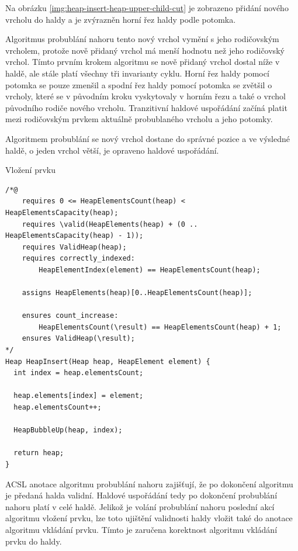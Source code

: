 Na obrázku \ref{img:heap-insert-heap-upper-child-cut} je zobrazeno přidání nového vrcholu do haldy a je zvýrazněn horní řez haldy podle potomka.

Algoritmus probublání nahoru tento nový vrchol vymění s jeho rodičovským vrcholem, protože nově přidaný vrchol má menší hodnotu než jeho rodičovský vrchol. Tímto prvním krokem algoritmu se nově přidaný vrchol dostal níže v haldě, ale stále platí všechny tři invarianty cyklu. Horní řez haldy pomocí potomka se pouze zmenšil a spodní řez haldy pomocí potomka se zvětšil o vrcholy, které se v původním kroku vyskytovaly v horním řezu a také o vrchol původního rodiče nového vrcholu. Tranzitivní haldové uspořádání začíná platit mezi rodičovským prvkem aktuálně probublaného vrcholu a jeho potomky.

Algoritmem probublání se nový vrchol dostane do správné pozice a ve výsledné haldě, o jeden vrchol větší, je opraveno haldové uspořádání.

\begin{listing}[H]
	\caption{Vložení prvku}
	\label{list:HeapInsert}
	\begin{verbatim}
/*@
    requires 0 <= HeapElementsCount(heap) < HeapElementsCapacity(heap);
    requires \valid(HeapElements(heap) + (0 .. HeapElementsCapacity(heap) - 1));
    requires ValidHeap(heap);
    requires correctly_indexed:
    	HeapElementIndex(element) == HeapElementsCount(heap);

    assigns HeapElements(heap)[0..HeapElementsCount(heap)];
    
    ensures count_increase: 
    	HeapElementsCount(\result) == HeapElementsCount(heap) + 1;
    ensures ValidHeap(\result);
*/
Heap HeapInsert(Heap heap, HeapElement element) {
  int index = heap.elementsCount;

  heap.elements[index] = element;
  heap.elementsCount++;

  HeapBubbleUp(heap, index);

  return heap;
}
	\end{verbatim}
\end{listing}

ACSL anotace algoritmu probublání nahoru zajišťují, že po dokončení algoritmu je předaná halda validní. Haldové uspořádání tedy po dokončení probublání nahoru platí v celé haldě. Jelikož je volání probublání nahoru poslední akcí algoritmu vložení prvku, lze toto ujištění validnosti haldy vložit také do anotace algoritmu vkládání prvku. Tímto je zaručena korektnost algoritmu vkládání prvku do haldy.

